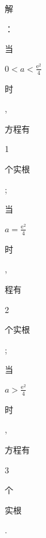 \documentclass[10pt]{article}
\begin{document}
\begin{CJK}{UTF8}{mj}解\end{CJK}：\begin{CJK}{UTF8}{mj}当\end{CJK} $0<a<\frac{\mathrm{e}^{2}}{4}$ \begin{CJK}{UTF8}{mj}时\end{CJK}, \begin{CJK}{UTF8}{mj}方程有\end{CJK} 1 \begin{CJK}{UTF8}{mj}个实根\end{CJK}; \begin{CJK}{UTF8}{mj}当\end{CJK} $a=\frac{\mathrm{e}^{2}}{4}$ \begin{CJK}{UTF8}{mj}时\end{CJK}, \begin{CJK}{UTF8}{mj}程有\end{CJK} 2 \begin{CJK}{UTF8}{mj}个实根\end{CJK}; \begin{CJK}{UTF8}{mj}当\end{CJK} $a>\frac{\mathrm{e}^{2}}{4}$ \begin{CJK}{UTF8}{mj}时\end{CJK}, \begin{CJK}{UTF8}{mj}方程有\end{CJK} 3 \begin{CJK}{UTF8}{mj}个\end{CJK} \begin{CJK}{UTF8}{mj}实根\end{CJK}.
\end{document}
